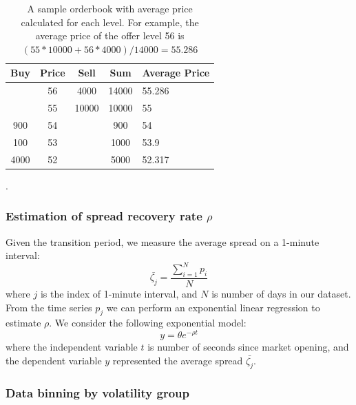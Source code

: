 \documentclass{article}
\begin{document}
\begin{table}[h]
  \centering
  \begin{tabular}{c|c|c|c|l}
    \hline
    \textbf{Buy} & \textbf{Price} & \textbf{Sell} & \textbf{Sum} & \multicolumn{1}{c}{\textbf{Average Price}} \\ \hline
                 & 56             & 4000          & 14000        & 55.286                                     \\ \hline
                 & 55             & 10000         & 10000        & 55                                         \\ \hline
    900          & 54             &               & 900          & 54                                         \\ \hline
    100          & 53             &               & 1000         & 53.9                                       \\ \hline
    4000         & 52             &               & 5000         & 52.317                                     \\ \hline
  \end{tabular}
  \caption{A sample orderbook with average price calculated for each level. For example, the average price of the offer level 56 is $(55*10000+56*4000)/14000 = 55.286$}.
  \label{tbl:bookAvgPxConversion}
\end{table}

\subsubsection{Estimation of spread recovery rate $\rho$}

Given the transition period, we measure the average spread on a 1-minute interval:
\[
  \bar{\zeta_j} = \frac{\sum_{i=1}^N p_i}{N}
\]
where $j$ is the index of 1-minute interval, and $N$ is number of days in our dataset. From the time series $p_j$ we can perform an exponential linear regression to estimate $\rho$. We consider the following exponential model:
\[
  y = \theta e^{-\rho t}
\]
where the independent variable $t$ is number of seconds since market opening, and the dependent variable $y$ represented the average spread $\bar{\zeta_j}$.

\subsubsection{Data binning by volatility group}
\end{document}
